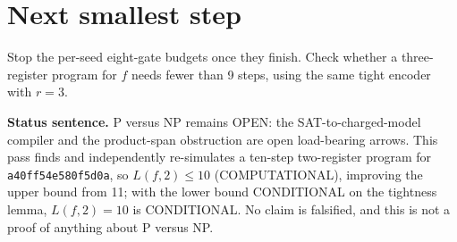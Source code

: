 \documentclass[11pt]{article}
\begin{document}
\section*{Next smallest step}
Stop the per-seed eight-gate budgets once they finish. Check whether a three-register program for $f$ needs fewer than 9 steps, using the same tight encoder with $r=3$.

\bigskip
\noindent\textbf{Status sentence.} P versus NP remains OPEN: the SAT-to-charged-model compiler and the product-span obstruction are open load-bearing arrows. This pass finds and independently re-simulates a ten-step two-register program for \texttt{a40ff54e580f5d0a}, so $L(f,2)\le 10$ (COMPUTATIONAL), improving the upper bound from 11; with the lower bound CONDITIONAL on the tightness lemma, $L(f,2)=10$ is CONDITIONAL. No claim is falsified, and this is not a proof of anything about P versus NP.
\end{document}
